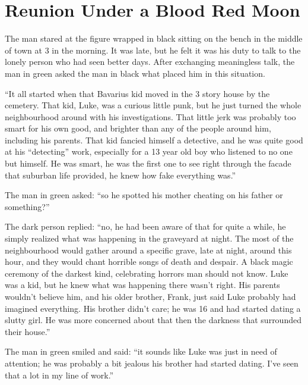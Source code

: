 \chapter[Reunion]{Reunion Under a Blood Red Moon}



The man stared at the figure wrapped in black sitting on the bench
in the middle of town at 3 in the morning. It was late, but he felt
it was his duty to talk to the lonely person who had seen better
days. After exchanging meaningless talk, the man in green asked the
man in black what placed him in this situation.

``It all started when that Bavarius kid moved in the 3 story
house by the cemetery. That kid, Luke, was a curious little punk,
but he just turned the whole neighbourhood around with his
investigations. That little jerk was probably too smart for his own
good, and brighter than any of the people around him, including his
parents. That kid fancied himself a detective, and he was quite
good at his ``detecting'' work, especially for a 13 year
old boy who listened to no one but himself. He was smart, he was
the first one to see right through the facade that suburban life
provided, he knew how fake everything was.''

The man in green asked: ``so he spotted his mother cheating on
his father or something?''

The dark person replied: ``no, he had been aware of that for
quite a while, he simply realized what was happening in the
graveyard at night. The most of the neighbourhood would gather
around a specific grave, late at night, around this hour, and they
would chant horrible songs of death and despair. A black magic
ceremony of the darkest kind, celebrating horrors man should not
know. Luke was a kid, but he knew what was happening there
wasn't right. His parents wouldn't believe him, and his
older brother, Frank, just said Luke probably had imagined
everything. His brother didn't care; he was 16 and had
started dating a slutty girl. He was more concerned about that then
the darkness that surrounded their house.''

The man in green smiled and said: ``it sounds like Luke was
just in need of attention; he was probably a bit jealous his
brother had started dating. I've seen that a lot in my line
of work.''

